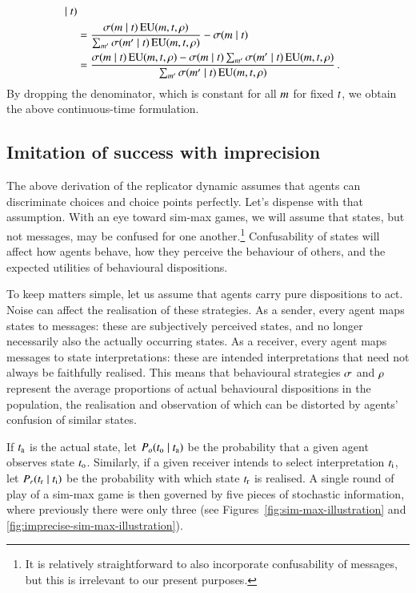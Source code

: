 \documentclass[12pt,english]{article}
\numberwithin{equation}{section}
\begin{document}
\begin{appendices}
\begin{align*}
    \mid t)\\ 
    & = \frac{\sigma(m \mid
    t)  \thinspace \mathrm{EU}(m,t,\rho)}{\sum_{m'}\sigma(m' \mid
    t)  \thinspace \mathrm{EU}(m,t,\rho)} - \sigma(m
      \mid t) \\
    & = \frac{\sigma(m \mid
    t)  \thinspace \mathrm{EU}(m,t,\rho) - \sigma(m \mid t) \sum_{m'}\sigma(m' \mid
    t)  \thinspace \mathrm{EU}(m,t,\rho) }{\sum_{m'}\sigma(m' \mid
    t)  \thinspace \mathrm{EU}(m,t,\rho)}
      \,.
  \end{align*}
By dropping the denominator, which is constant for all $m$ for fixed
$t$, we obtain the above continuous-time formulation.


\subsection{Imitation of success with imprecision}
\label{sec:imit-succ-with}

The above derivation of the replicator dynamic assumes that agents can discriminate choices and
choice points perfectly. Let's dispense with that assumption. With an eye toward sim-max games,
we will assume that states, but not messages, may be confused for one another.\footnote{It is
  relatively straightforward to also incorporate confusability of messages, but this is
  irrelevant to our present purposes.} Confusability of states will affect how agents behave,
how they perceive the behaviour of others, and the expected utilities of behavioural
dispositions.

To keep matters simple, let us assume that agents carry pure dispositions to act. Noise can
affect the realisation of these strategies. As a sender, every agent maps states to messages:
these are subjectively perceived states, and no longer necessarily also the actually occurring
states. As a receiver, every agent maps messages to state interpretations: these are intended
interpretations that need not always be faithfully realised. This means that behavioural
strategies $\sigma$ and $\rho$ represent the average proportions of actual
behavioural dispositions in the population, the realisation and observation of which can be
distorted by agents' confusion of similar states.

If $t_{\mathrm{a}}$ is the actual state, let $P_o(t_{\mathrm{o}} \mid t_{\mathrm{a}})$ be the
probability that a given agent observes state $t_{\mathrm{o}}$. Similarly, if a given receiver
intends to select interpretation $t_{\mathrm{i}}$, let $P_r(t_{\mathrm{r}} \mid t_{\mathrm{i}})$ be
the probability with which state $t_{\mathrm{r}}$ is realised. A single round of play of a sim-max
game is then governed by five pieces of stochastic information, where previously there were
only three (see Figures~\ref{fig:sim-max-illustration} and
\ref{fig:imprecise-sim-max-illustration}). 


\end{appendices}
\end{document}
